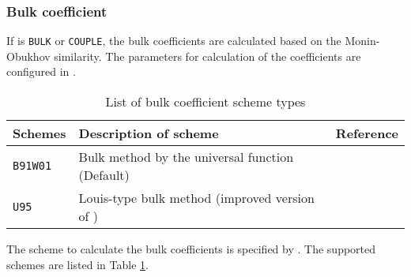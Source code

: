 \subsubsection{Bulk coefficient}
If  is \verb|BULK| or \verb|COUPLE|, the bulk coefficients are calculated based on the Monin-Obukhov similarity.
The parameters for calculation of the coefficients are configured in .

\begin{table}[h]
\begin{center}
  \caption{List of bulk coefficient scheme types}
  \label{tab:nml_bulk}
  \begin{tabularx}{150mm}{llX} \hline
    \rowcolor[gray]{0.9}  Schemes & Description of scheme & Reference\\ \hline
      \verb|B91W01| & Bulk method by the universal function (Default) & \citet{beljaars_1991,wilson_2001,nishizawa_2018} \\
      \verb|U95|    & Louis-type bulk method  (improved version of \citet{louis_1979}) & \citet{uno_1995} \\
    \hline
  \end{tabularx}
\end{center}
\end{table}

The scheme to calculate the bulk coefficients is specified by .
The supported schemes are listed in Table \ref{tab:nml_bulk}.

